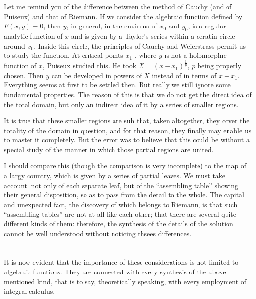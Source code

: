 \documentclass[12pt,oneside]{book}
\begin{document}
Let me remind you of the difference between the method of Cauchy (and of Puiseux) and that of Riemann. If we consider the algebraic function defined by $F(x,y)=0$, then $y$, in general, in the environs of $x_0$ and $y_0$, is a regular analytic function of $x$ and is given by a Taylor's series within a ceratin circle around $x_0$. Inside this circle, the principles of Cauchy and Weierstrass permit us to study the function. At critical points $x_1$ , where $y$ is not a holomorphic function of $x$, Puiseux studied this. He took $X=(x-x_1)^\frac{1}{p}$, $p$ being properly chosen. Then $y$ can be developed in powers of $X$ instead of in terms of $x-x_1$. Everything seems at first to be settled then. But really we still ignore some fundamental properties. The reason of this is that we do not get the direct idea of the total domain, but only an indirect idea of it by a series of smaller regions. \par 

It is true that these smaller regions are suh that, taken altogether, they cover the totality of the domain in question, and for that reason, they finally may enable us to master it completely. But the error was to believe that this could be without a special study of the manner in which those partial regions are united. \par 

I should compare this (though the comparison is very incomplete) to the map of a largy country, which is given by a series of partial leaves. We must take account, not only of each separate leaf, but of the ``assembling table'' showing their general disposition, so as to pass from the detail to the whole. The capital and unexpected fact, the discovery of which belongs to Riemann, is that such ``assembling tables'' are not at all like each other; that there are several quite different kinds of them: therefore, the synthesis of the details of the solution cannot be well understood without noticing thsees differences. \par 

\section{}
It is now evident that the importance of these considerations is not limited to algebraic functions. They are connected with every synthesis of the above mentioned kind, that is to say, theoretically speaking, with every employment of integral calculus. \par 
\end{document}
